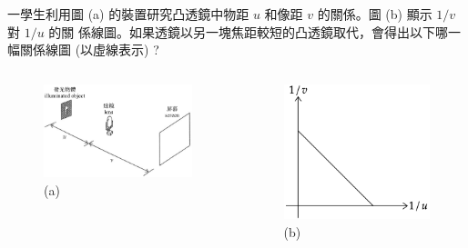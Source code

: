 \documentclass[beamer=true]{standalone}
\begin{document}
\begin{eg}
    一學生利用圖 (a) 的裝置研究凸透鏡中物距 $u$ 和像距 $v$ 的關係。圖 (b) 顯示 $1/v$ 對 $1/u$ 的關
    係線圖。如果透鏡以另一塊焦距較短的凸透鏡取代，會得出以下哪一幅關係線圖 (以虛線表示) ?\bigskip
    \begin{columns}
        \begin{figure}
            \centering
            \includegraphics[width=\linewidth]{assets/d980un82dun8923d23.png}
            \caption{(a)}
        \end{figure}
        \begin{figure}
            \centering
            \includegraphics[width=\linewidth]{assets/dm90j2d3.png}
            \caption{(b)}
        \end{figure}
    \end{columns}
\end{eg}
\end{document}
